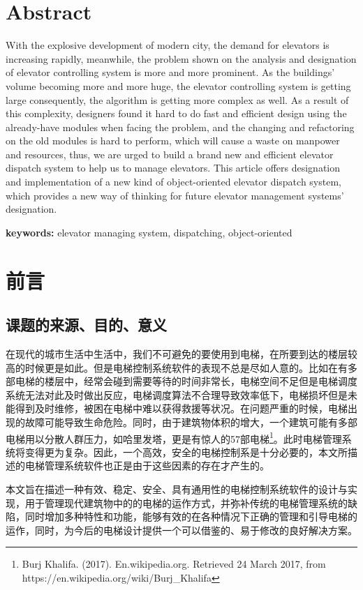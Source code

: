 \section{Abstract}
With the explosive development of modern city, the demand for elevators is increasing rapidly, meanwhile, the problem shown on the analysis and designation of elevator controlling system is more and more prominent. As the buildings' volume becoming more and more huge, the elevator controlling system is getting large consequently, the algorithm is getting more complex as well. As a result of this complexity, designers found it hard to do fast and efficient design using the already-have modules when facing the problem, and the changing and refactoring on the old modules is hard to perform, which will cause a waste on manpower and resources, thus, we are urged to build a brand new and efficient elevator dispatch system to help us to manage elevators. This article offers designation and implementation of a new kind of object-oriented elevator dispatch system, which provides a new way of thinking for future elevator management systems' designation. \par
{\textbf{keywords:} elevator managing system, dispatching, object-oriented}


\newpage
\section{前言}
\subsection{课题的来源、目的、意义}
在现代的城市生活中生活中，我们不可避免的要使用到电梯，在所要到达的楼层较高的时候更是如此。但是电梯控制系统软件的表现不总是尽如人意的。比如在有多部电梯的楼层中，经常会碰到需要等待的时间非常长，电梯空间不足但是电梯调度系统无法对此及时做出反应，电梯调度算法不合理导致效率低下，电梯损坏但是未能得到及时维修，被困在电梯中难以获得救援等状况。在问题严重的时候，电梯出现的故障可能导致生命危险。同时，由于建筑物体积的增大，一个建筑可能有多部电梯用以分散人群压力，如哈里发塔，更是有惊人的57部电梯\footnote{Burj Khalifa. (2017). En.wikipedia.org. Retrieved 24 March 2017, from https://en.wikipedia.org/wiki/Burj\_Khalifa}。此时电梯管理系统将变得更为复杂。因此，一个高效，安全的电梯控制系是十分必要的，本文所描述的电梯管理系统软件也正是由于这些因素的存在才产生的。\par

本文旨在描述一种有效、稳定、安全、具有通用性的电梯控制系统软件的设计与实现，用于管理现代建筑物中的的电梯的运作方式，并弥补传统的电梯管理系统的缺陷，同时增加多种特性和功能，能够有效的在各种情况下正确的管理和引导电梯的运作，同时，为今后的电梯设计提供一个可以借鉴的、易于修改的良好解决方案。\par

